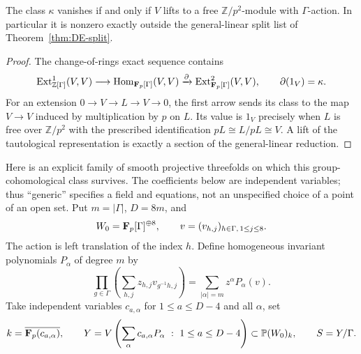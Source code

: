 \begin{lemma}\label{lem:DE-kappa}
The class $\kappa$ vanishes if and only if $V$ lifts to a free $\mathbb Z/p^2$-module with $\Gamma$-action.  In particular it is nonzero exactly outside the general-linear split list of Theorem~\ref{thm:DE-split}.
\end{lemma}
\begin{proof}
The change-of-rings exact sequence contains
\[
 \operatorname{Ext}^1_{\mathbb Z[\Gamma]}(V,V)\longrightarrow
 \operatorname{Hom}_{\mathbf F_p[\Gamma]}(V,V)\xrightarrow{\partial}
 \operatorname{Ext}^2_{\mathbf F_p[\Gamma]}(V,V),
 \qquad\partial(1_V)=\kappa.
\]
For an extension $0\to V\to L\to V\to0$, the first arrow sends its class to the map $V\to V$ induced by multiplication by $p$ on $L$.  Its value is $1_V$ precisely when $L$ is free over $\mathbb Z/p^2$ with the prescribed identification $pL\cong L/pL\cong V$.  A lift of the tautological representation is exactly a section of the general-linear reduction.
\end{proof}

Here is an explicit family of smooth projective threefolds on which this group-cohomological class survives.  The coefficients below are independent variables; thus ``generic'' specifies a field and equations, not an unspecified choice of a point of an open set.  Put $m=|\Gamma|$, $D=8m$, and
\[
 W_0=\mathbf F_p[\Gamma]^{\oplus8},\qquad
 v=(v_{h,j})_{h\in\Gamma,\,1\leq j\leq8}.
\]
The action is left translation of the index $h$.  Define homogeneous invariant polynomials $P_\alpha$ of degree $m$ by
\[
 \prod_{g\in\Gamma}\left(\sum_{h,j}z_{h,j}v_{g^{-1}h,j}\right)
    =\sum_{|\alpha|=m}z^\alpha P_\alpha(v).
\]
Take independent variables $c_{a,\alpha}$ for $1\leq a\leq D-4$ and all $\alpha$, set
\[
 k=\overline{\mathbf F_p(c_{a,\alpha})},\qquad
 Y=V\left(\sum_\alpha c_{a,\alpha}P_\alpha\ :\ 1\leq a\leq D-4\right)
      \subset\mathbb P(W_0)_k,\qquad S=Y/\Gamma.
\]


